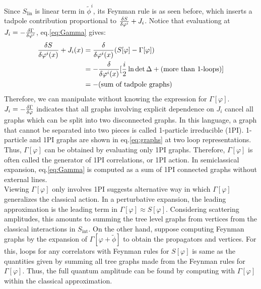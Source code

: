 \indent Since $S_{\text{lin}}$ is linear term in $\tilde{\phi}^{i}$, its Feynman rule is as seen before, which inserts a tadpole contribution proportional to $\fdv{S}{\varphi ^{i}} + J_{i}$. Notice that evaluationg at $J_{i} = -\fdv{\Gamma}{\varphi ^{i}}$, eq.\ref{eq:Gamma} gives:
\begin{align}
    \begin{split}
    \fdv{S}{\varphi^{i}(x)} + J_{i}(x) &= \fdv{\varphi^{i}(x)} (S[\varphi] - \Gamma[\varphi])\\
    &= - \fdv{\varphi^{i}(x)} [\frac{i}{2} \ln \det \Delta + (\text{more than 1-loops})] \\
    & = -(\text{sum of tadpole graphs})
    \end{split}
\end{align}
Therefore, we can manipulate without knowing the expression for $\Gamma[\varphi]$. $J_{i} =-\fdv{\Gamma}{\varphi}$ indicates that all graphs involving explicit dependence on $J_{i}$ cancel all graphs which can be split into two disconnected graphs. In this language, a graph that cannot be separated into two pieces is called 1-particle irreducible (1PI). 1-particle and 1PI graphs are shown in eq.\ref{eq:graphs} at two loop representations. Thus, $\Gamma[\varphi]$ can be obtained by evaluating only 1PI graphs. Therefore, $\Gamma[\varphi]$ is often called the generator of 1PI correlations, or 1PI action. In semiclassical expansion, eq.\ref{eq:Gamma} is computed as a sum of 1PI connected graphs without external lines. \\
\indent Viewing $\Gamma[\varphi]$ only involves 1PI suggests alternative way in which $\Gamma[\varphi]$ generalizes the classical action. In a perturbative expansion, the leading approximation is the leading term in $\Gamma[\varphi] \approx S[\varphi]$. Considering scattering amplitudes, this amounts to summing the tree level graphs from vertices from the classical interactions in $S_{\text{int}}$. On the other hand, suppose computing Feynman graphs by the expansion of $\Gamma[\varphi + \tilde{\phi}]$ to obtain the propagators and vertices. For this, loops for any correlators with Feynman rules for $S[\varphi]$ is same as the quantities given by summing all tree graphs made from the Feynman rules for $\Gamma[\varphi]$. Thus, the full quantum amplitude can be found by computing with $\Gamma[\varphi]$ within the classical approximation. 


